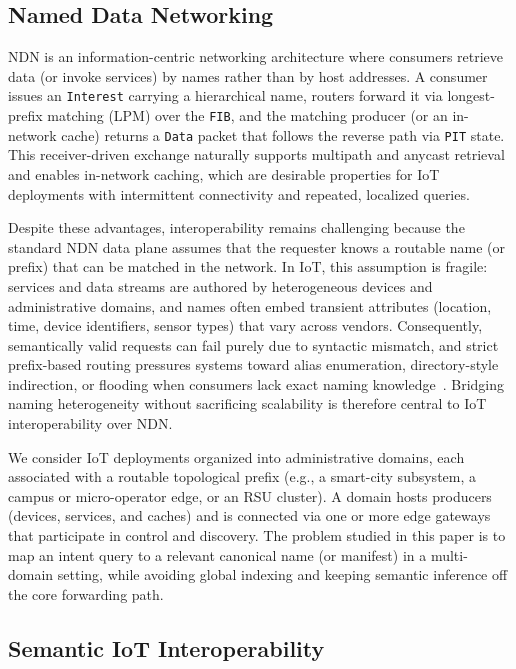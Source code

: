 \documentclass[journal]{IEEEtran}
\begin{document}
\subsection{Named Data Networking}
\label{sec:bg_ndn}

NDN is an information-centric networking architecture where consumers retrieve data (or invoke services) by names rather than by host addresses. A consumer issues an \texttt{Interest} carrying a hierarchical name, routers forward it via longest-prefix matching (LPM) over the \texttt{FIB}, and the matching producer (or an in-network cache) returns a \texttt{Data} packet that follows the reverse path via \texttt{PIT} state. This receiver-driven exchange naturally supports multipath and anycast retrieval and enables in-network caching, which are desirable properties for IoT deployments with intermittent connectivity and repeated, localized queries.

Despite these advantages, interoperability remains challenging because the standard NDN data plane assumes that the requester knows a routable name (or prefix) that can be matched in the network. In IoT, this assumption is fragile: services and data streams are authored by heterogeneous devices and administrative domains, and names often embed transient attributes (location, time, device identifiers, sensor types) that vary across vendors. Consequently, semantically valid requests can fail purely due to syntactic mismatch, and strict prefix-based routing pressures systems toward alias enumeration, directory-style indirection, or flooding when consumers lack exact naming knowledge~\cite{amadeo2025saf,dt_vndn_semantic,grewe2018sodi}. Bridging naming heterogeneity without sacrificing scalability is therefore central to IoT interoperability over NDN.

We consider IoT deployments organized into administrative domains, each associated with a routable topological prefix (e.g., a smart-city subsystem, a campus or micro-operator edge, or an RSU cluster).
A domain hosts producers (devices, services, and caches) and is connected via one or more edge gateways that participate in control and discovery.
The problem studied in this paper is to map an intent query to a relevant canonical name (or manifest) in a multi-domain setting, while avoiding global indexing and keeping semantic inference off the core forwarding path.

\subsection{Semantic IoT Interoperability}
\label{sec:bg_semantic_iot}
\end{document}
